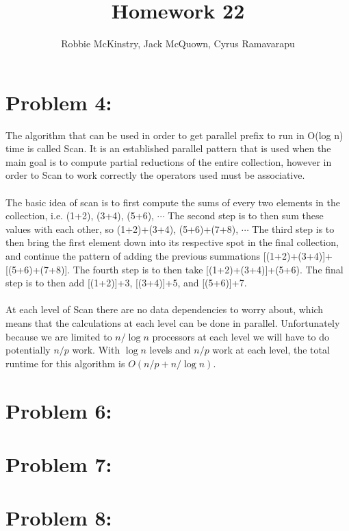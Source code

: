\documentclass[12pt]{article}
\begin{document}
\title{Homework 22}
\author{Robbie McKinstry, Jack McQuown, Cyrus Ramavarapu}
\renewcommand{\today}{24 October 2016}
\renewcommand{\baselinestretch}{1.5}
\maketitle

\section*{Problem 4: }
The algorithm that can be used in order to get parallel prefix to run in {O(log n)} time is called Scan. It is an established parallel 
pattern that is used when the main goal is to compute partial reductions of the entire collection, however in order to Scan to work 
correctly the operators used must be associative.\\\\
The basic idea of scan is to first compute the sums of every two elements in the collection, i.e. (1+2), (3+4), (5+6), {$\cdots$} The second step is to then sum these values with each other, so (1+2)+(3+4), (5+6)+(7+8), {$\cdots$} The third step is to then bring the first element down into its respective spot in the final collection, and continue the pattern of adding the previous summations
[(1+2)+(3+4)]+[(5+6)+(7+8)]. The fourth step is to then take [(1+2)+(3+4)]+(5+6). The final step is to then add [(1+2)]+3, [(3+4)]+5, and [(5+6)]+7.\\\\
At each level of Scan there are no data dependencies to worry about, which means that the calculations at each level can be done in parallel. Unfortunately because we are limited to {$n/\log n$} processors at each level we will have to do potentially {$n/p$} work. With {$\log n$} levels and {$n/p$} work at each level, the total runtime for this algorithm is {$O(n/p + n/\log n)$}.
\section*{Problem 6: }
\section*{Problem 7: }
\section*{Problem 8: }
\end{document}
